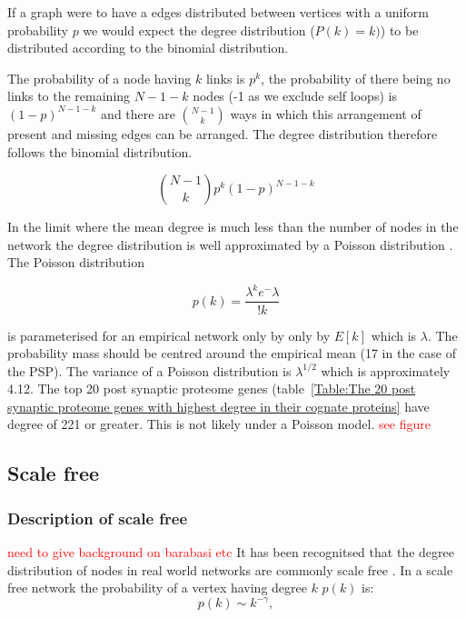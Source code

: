 If a graph were to have a  edges distributed between vertices with a uniform probability $p$ we would expect the degree distribution ($P(k)=k)$) to be distributed according to the binomial distribution.  

 The probability of a node having $k$ links is $p^k$, the probability of there being no links to the remaining $N-1-k$ nodes (-1 as we exclude self loops) is $(1-p)^{N-1-k}$ and there are $\binom{N-1}{k}$ ways in which this arrangement of present and missing edges can be arranged. The degree distribution therefore follows the binomial distribution.\cite{barabasi2016network}

\begin{equation}
   \binom{N-1}{k}        p^k (1-p)^{N-1-k}
   \label{Equation:BinomialDistributionForDegreeProbability}
\end{equation}

In the limit where the mean degree is much less than the number of nodes in the network the degree distribution is well approximated by a Poisson distribution \cite{barabasi2016network}. The Poisson distribution

\begin{equation}
    p(k) = \frac{\lambda^k e ^-\lambda}{!k}
\end{equation}

is parameterised for an empirical network only by only by $E[k]$ which is $\lambda$.  The probability mass should be centred around the empirical mean  (17 in the case of the PSP). The variance of a Poisson distribution is $\lambda^{1/2}$ which is approximately 4.12. The top 20 post synaptic proteome genes (table~\ref{Table:The 20 post synaptic proteome genes with highest degree in their cognate proteins} have degree of 221 or greater.  This is not likely under a Poisson model.   
 \textcolor{red}{see figure}


\subsection{Scale free}
\label{sec:scale_free}
\subsubsection{Description of scale free}

\textcolor{red}{need to give background on barabasi etc}
It has been recognitsed that the degree distribution of nodes in real world networks are commonly scale free \cite{barabasi1999emergence} \cite{barabasi1999mean}. In a scale free network the probability of a vertex having degree $k$ $p(k)$ is:
\begin{equation}
    p(k) \sim k^{-\gamma},
\end{equation}
\label{eq:scale free}

